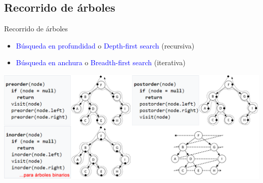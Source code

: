 \documentclass[handout]{beamer} %
\newcommand{\blue}[1]{\textcolor{blue}{#1}}
\begin{document}
\subsection{Recorrido de árboles}

\begin{frame}{Recorrido de árboles}
    {\footnotesize
    \begin{itemize}
        \item \blue{Búsqueda en profundidad} o \blue{Depth-first search} (recursiva)
        \item \blue{Búsqueda en anchura} o \blue{Breadth-first search} (iterativa)
    \end{itemize}
    \begin{center}
        \includegraphics[width=\textwidth]{./image/cap3/recorrer-arbol}\\
    \end{center}}
\end{frame}
\end{document}
